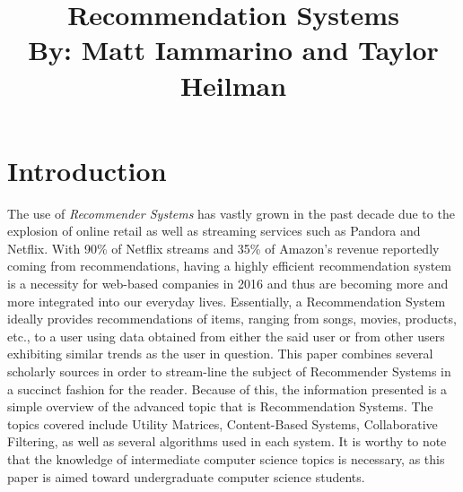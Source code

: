 \documentclass[11pt,reqno]{amsart}
\theoremstyle{definition}
\numberwithin{equation}{subsection}
\newcommand\tab[1][1cm]{\hspace*{#1}}
\begin{document}
\title[CS/MATH 335 Final Paper] {Recommendation Systems \\ By: Matt Iammarino and Taylor Heilman\\ }
\maketitle





\tableofcontents

\section{Introduction}

\tab  The use of \textit{Recommender Systems} has vastly grown in the past decade due to the explosion of online retail as well as streaming services such as Pandora and Netflix. With 90\% of Netflix streams and 35\% of Amazon's revenue reportedly coming from recommendations, having a highly efficient recommendation system is a necessity for web-based companies in 2016 and thus are becoming more and more integrated into our everyday lives. Essentially, a Recommendation System ideally provides recommendations of items, ranging from songs, movies, products, etc., to a user using data obtained from either the said user or from other users exhibiting similar trends as the user in question. This paper combines several scholarly sources in order to stream-line the subject of Recommender Systems in a succinct fashion for the reader. Because of this, the information presented is a simple overview of the advanced topic that is Recommendation Systems. The topics covered include Utility Matrices, Content-Based Systems, Collaborative Filtering, as well as several algorithms used in each system. It is worthy to note that the knowledge of intermediate computer science topics is necessary, as this paper is aimed toward undergraduate computer science students.
\newline
\end{document}
